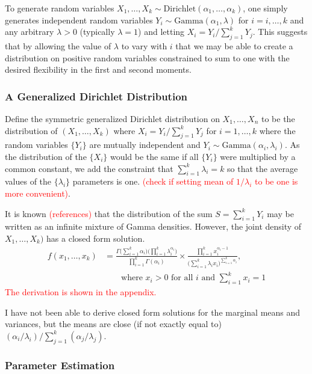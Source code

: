 \documentclass[conference]{IEEEtran}
\newcommand{\falta}[1]{\textcolor{red}{#1}}
\begin{document}
To generate random variables $X_1,\ldots,X_k \sim
\text{Dirichlet}(\alpha_1,\ldots,\alpha_k)$, one simply generates
independent random variables $Y_i \sim \text{Gamma}(\alpha_1,\lambda)$
for $i=i,\ldots,k$ and any arbitrary $\lambda>0$ (typically
$\lambda=1$) and letting $X_i = Y_i / \sum_{j=1}^k Y_j$.  This
suggests that by allowing the value of $\lambda$ to vary with $i$ that
we may be able to create a distribution on positive random variables
constrained to sum to one with the desired flexibility in the first
and second moments.

\subsubsection*{A Generalized Dirichlet Distribution}

Define the symmetric generalized Dirichlet distribution on
$X_1,\ldots,X_n$ to be the distribution of $(X_1,\ldots,X_k)$ where
$X_i = Y_i \big/ \sum_{j=1}^k Y_j$ for $i=1,\ldots,k$ where the random
variables $\{Y_i\}$ are mutually independent and $Y_i \sim
\text{Gamma}(\alpha_i,\lambda_i)$.  As the distribution of the
$\{X_i\}$ would be the same if all $\{Y_i\}$ were multiplied by a
common constant, we add the constraint that $\sum_{i=1}^k \lambda_i =
k$ so that the average values of the $\{\lambda_i\}$ parameters is
one.  \falta{(check if setting mean of $1/\lambda_i$ to be one is more
  convenient)}.

It is known \falta{(references)} that the distribution of the sum $S =
\sum_{i=1}^k Y_i$ may be written as an infinite mixture of Gamma
densities.  However, the joint density of $X_1,\ldots,X_k)$ has a
closed form solution.
\begin{align*}
  f(x_1,\ldots,x_k) &= \frac{\Gamma\big(\sum_{i=1}^k
    \alpha_i\big)\big(\prod_{i=1}^k
    \lambda_i^{\alpha_i}\big)}{\prod_{i=1}^k \Gamma(\alpha_i)}
  \times \frac{\prod_{i=1}^k x_i^{\alpha_i - 1}}{\big(\sum_{i=1}^k
    \lambda_i x_i\big)^{\sum_{i=1}^k \alpha_i}},\\ &\qquad \text{where
    $x_i > 0$ for all $i$ and $\sum_{i=1}^k x_i = 1$}
\end{align*}
\falta{The derivation is shown in the appendix.}

I have not been able to derive closed form solutions for the marginal
means and variances, but the means are close (if not exactly equal to)
$(\alpha_i/\lambda_i) \big/ \sum_{j=1}^k (\alpha_j/\lambda_j)$.

\subsubsection*{Parameter Estimation}
\end{document}
